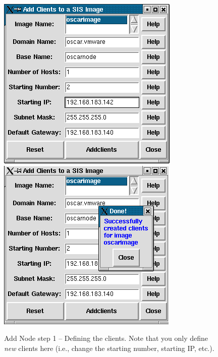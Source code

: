 \begin{figure}[h!]
  \begin{center}
    \centerline{
      \includegraphics[scale=\imgscale]{figs/9b_sbs-add-node-mksirange}
      \hspace{\imghskip}
      \includegraphics[scale=\imgscale]{figs/9c_sbs-add-node-success}
      }
    \caption[Add Node step 1 -- Defining the clients.]{Add Node step 1
      -- Defining the clients.  Note that you only define {\em new}
      clients here (i.e., change the starting number, starting IP,
      etc.).}
    \label{fig:sbs-add-node1-define-clients}
  \end{center}
\end{figure}

